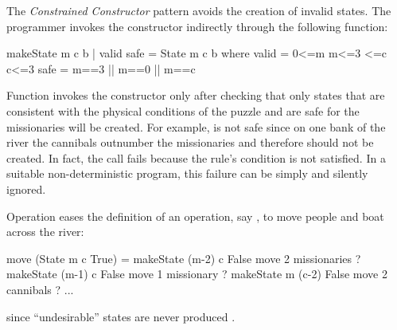 The \emph{Constrained Constructor} pattern avoids
the creation of invalid states.
The programmer invokes the constructor indirectly
through the following function:
%
\begin{prog}
makeState m c b | valid \boolAnd safe = State m c b
   where valid = 0<=m \boolAnd m<=3 <=c \boolAnd c<=3
         safe  = m==3 || m==0 || m==c
\end{prog}
%
Function  invokes the constructor only
after checking that only states
that are consistent with the physical conditions of the
puzzle and are safe for the missionaries will be created.
For example, 
 is not safe since on one bank of the river
the cannibals outnumber the missionaries
and therefore should not be created.
In fact, the call  fails because
the rule's condition is not satisfied.
In a suitable non-deterministic program, this failure can be
simply and silently ignored.

Operation  eases the definition of an operation,
say , to move people and boat across the river:
%
\begin{prog}
move (State m c True)
   = makeState (m-2) c False      \lineComment move 2 missionaries
   ? makeState (m-1) c False      \lineComment move 1 missionary
   ? makeState m (c-2) False      \lineComment move 2 cannibals
   ? ...
\end{prog}
%
since ``undesirable'' states are never produced
.
